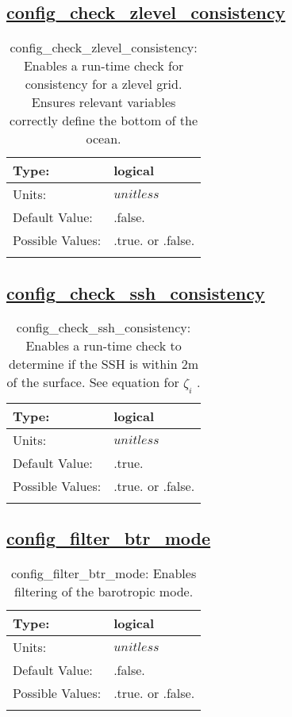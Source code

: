 \subsection[config\_check\_zlevel\_consistency]{\hyperref[sec:nm_tab_debug]{config\_check\_zlevel\_consistency}}
\label{subsec:nm_sec_config_check_zlevel_consistency}
\begin{center}
\begin{longtable}{| p{2.0in} || p{4.0in} |}
    \hline
    Type: & logical \\
    \hline
    Units: & $unitless$ \\
    \hline
    Default Value: & .false. \\
    \hline
    Possible Values: & .true. or .false. \\
    \hline
    \caption{config\_check\_zlevel\_consistency: Enables a run-time check for consistency for a zlevel grid. Ensures relevant variables correctly define the bottom of the ocean.}
\end{longtable}
\end{center}
\subsection[config\_check\_ssh\_consistency]{\hyperref[sec:nm_tab_debug]{config\_check\_ssh\_consistency}}
\label{subsec:nm_sec_config_check_ssh_consistency}
\begin{center}
\begin{longtable}{| p{2.0in} || p{4.0in} |}
    \hline
    Type: & logical \\
    \hline
    Units: & $unitless$ \\
    \hline
    Default Value: & .true. \\
    \hline
    Possible Values: & .true. or .false. \\
    \hline
    \caption{config\_check\_ssh\_consistency:  Enables a run-time check to determine if the SSH is within 2m of the surface.  See equation for  $\zeta_i$ .}
\end{longtable}
\end{center}
\subsection[config\_filter\_btr\_mode]{\hyperref[sec:nm_tab_debug]{config\_filter\_btr\_mode}}
\label{subsec:nm_sec_config_filter_btr_mode}
\begin{center}
\begin{longtable}{| p{2.0in} || p{4.0in} |}
    \hline
    Type: & logical \\
    \hline
    Units: & $unitless$ \\
    \hline
    Default Value: & .false. \\
    \hline
    Possible Values: & .true. or .false. \\
    \hline
    \caption{config\_filter\_btr\_mode: Enables filtering of the barotropic mode.}
\end{longtable}
\end{center}
